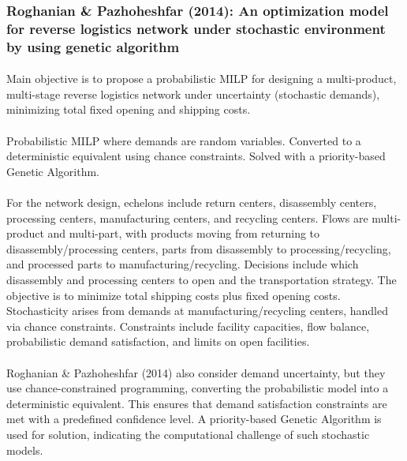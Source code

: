 \subsubsection{Roghanian \& Pazhoheshfar (2014): An optimization model for reverse logistics network under stochastic environment by using genetic algorithm}

\paragraph{} Main objective is to propose a probabilistic MILP for designing a multi-product, multi-stage reverse logistics network under uncertainty (stochastic demands), minimizing total fixed opening and shipping costs.

\paragraph{} Probabilistic MILP where demands are random variables. Converted to a deterministic equivalent using chance constraints. Solved with a priority-based Genetic Algorithm.

\paragraph{} For the network design, echelons include return centers, disassembly centers, processing centers, manufacturing centers, and recycling centers. Flows are multi-product and multi-part, with products moving from returning to disassembly/processing centers, parts from disassembly to processing/recycling, and processed parts to manufacturing/recycling. Decisions include which disassembly and processing centers to open and the transportation strategy. The objective is to minimize total shipping costs plus fixed opening costs. Stochasticity arises from demands at manufacturing/recycling centers, handled via chance constraints. Constraints include facility capacities, flow balance, probabilistic demand satisfaction, and limits on open facilities.

\paragraph{} Roghanian \& Pazhoheshfar (2014) also consider demand uncertainty, but they use chance-constrained programming, converting the probabilistic model into a deterministic equivalent. This ensures that demand satisfaction constraints are met with a predefined confidence level. A priority-based Genetic Algorithm is used for solution, indicating the computational challenge of such stochastic models.

